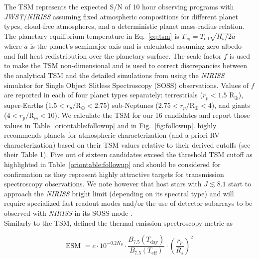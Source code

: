 \noindent The TSM represents the expected S/N of 10 hour observing programs with \emph{JWST}/\emph{NIRISS}
assuming fixed atmospheric compositions for different planet types, cloud-free atmospheres, and a
deterministic planet mass-radius relation. The planetary equilibrium temperature in Eq.~\ref{eq:tsm}
is $T_{\text{eq}} = T_{\text{eff}} \sqrt{R_s/2a}$ where $a$ is the planet's semimajor axis and is calculated
assuming zero albedo and full heat redistribution over the planetary surface. The scale factor $f$ is
used to make the TSM non-dimensional and is used to correct discrepancies between the analytical TSM
and the detailed simulations from \cite{louie18} using the \emph{NIRISS} simulator for Single Object
Slitless Spectroscopy (SOSS) observations. Values of $f$ are reported in \cite{kempton18} each of four
planet types separately: terrestrials ($r_p < 1.5$ R$_{\oplus}$), super-Earths ($1.5 < r_p/\text{R}_{\oplus} < 2.75$) 
sub-Neptunes ($2.75 < r_p/\text{R}_{\oplus} < 4$), and giants ($4 < r_p/\text{R}_{\oplus} < 10$). 
We calculate the TSM for our 16 candidates and report those values in Table~\ref{oriontable:followup} and in
Fig.~\ref{fig:followup}. \cite{kempton18} highly recommends planets for atmospheric characterization
(and a-priori RV characterization) based on their TSM values relative to their derived cutoffs (see
their Table 1). Five out of sixteen candidates exceed the threshold TSM cutoff as highlighted in Table~\ref{oriontable:followup}
and should be considered for confirmation as they represent highly attractive targets for transmission spectroscopy
observations. We note however that host stars with $J\lesssim 8.1$ start to approach the \emph{NIRISS}
bright limit (depending on its spectral type) and will require specialized fast readout modes and/or the use
of detector subarrays to be observed with \emph{NIRISS} in its SOSS mode \citep{beichman14}. \\

Similarly to the TSM, \cite{kempton18} defined the thermal emission spectroscopy metric as

\begin{equation}
  \text{ESM } = c \cdot 10^{-0.2K_{\text{S}}} \cdot \frac{B_{7.5}(T_{\text{day}})}{B_{7.5}(T_{\text{eff}})} \cdot
  \left( \frac{r_p}{R_s} \right)^2
\end{equation}

